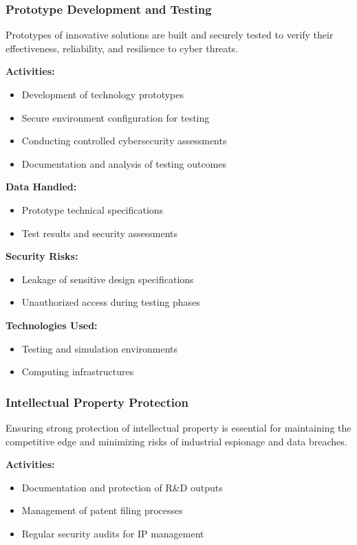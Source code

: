 \subsubsection{Prototype Development and Testing}

Prototypes of innovative solutions are built and securely tested to verify their effectiveness, reliability, and resilience to cyber threats.

\textbf{Activities:}
\begin{itemize}
    \item Development of technology prototypes
    \item Secure environment configuration for testing
    \item Conducting controlled cybersecurity assessments
    \item Documentation and analysis of testing outcomes
\end{itemize}

\textbf{Data Handled:}
\begin{itemize}
    \item Prototype technical specifications
    \item Test results and security assessments
\end{itemize}

\textbf{Security Risks:}
\begin{itemize}
    \item Leakage of sensitive design specifications
    \item Unauthorized access during testing phases
\end{itemize}

\textbf{Technologies Used:}
\begin{itemize}
    \item Testing and simulation environments
    \item Computing infrastructures
\end{itemize}

\subsubsection{Intellectual Property Protection}

Ensuring strong protection of intellectual property is essential for maintaining the competitive edge and minimizing risks of industrial espionage and data breaches.

\textbf{Activities:}
\begin{itemize}
    \item Documentation and protection of R\&D outputs
    \item Management of patent filing processes
    \item Regular security audits for IP management
\end{itemize}


